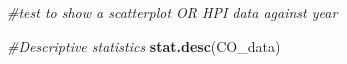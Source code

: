 \documentclass[
]{article}
\newenvironment{Shaded}{\begin{snugshade}}{\end{snugshade}}
\newcommand{\CommentTok}[1]{\textcolor[rgb]{0.56,0.35,0.01}{\textit{#1}}}
\newcommand{\KeywordTok}[1]{\textcolor[rgb]{0.13,0.29,0.53}{\textbf{#1}}}
\newcommand{\NormalTok}[1]{#1}
\newcommand{\OperatorTok}[1]{\textcolor[rgb]{0.81,0.36,0.00}{\textbf{#1}}}
\newcommand{\StringTok}[1]{\textcolor[rgb]{0.31,0.60,0.02}{#1}}
\begin{document}
\begin{Shaded}
\begin{Highlighting}[]
\CommentTok{#test to show a scatterplot OR HPI data against year}
\end{Highlighting}
\end{Shaded}

\begin{Shaded}
\end{Shaded}

\begin{Shaded}
\begin{Highlighting}[]
\CommentTok{#Descriptive statistics}
\KeywordTok{stat.desc}\NormalTok{(CO_data)}
\end{Highlighting}
\end{Shaded}
\end{document}
